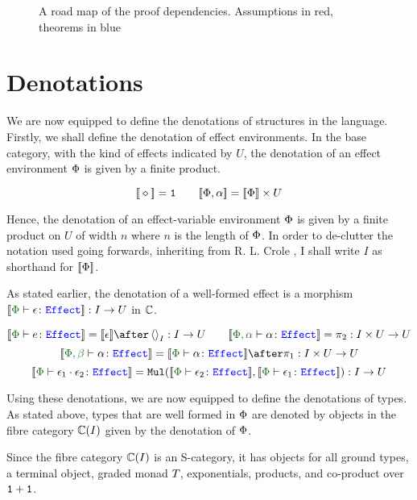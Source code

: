 \documentclass{Report}
\begin{document}
\begin{figure}[h!]
\begin{center}
{
    }
    \end{center}
\caption{A road map of the proof dependencies. Assumptions in red, theorems in blue}
\label{RoadMap}
\end{figure}


\section{Denotations}\label{PECDenotations}
We are now equipped to define the denotations of structures in the language. Firstly, we shall define the denotation of effect environments. In the base category, with the kind of effects indicated by $U$, the denotation of an effect environment $\P$ is given by a finite product.

\[
\deno{\nil} = \1 \quad\quad \deno{\P, \a} = \deno{\P}\times U    
\]

Hence, the denotation of an  effect-variable environment $\P$ is given by a finite product on $U$ of width $n$ where $n$ is the length of $\P$. In order to de-clutter the notation used going forwards, inheriting from R. L. Crole \needsRef, I shall write $I$ as shorthand for $\deno{\P}$.  


As stated earlier, the denotation of a well-formed effect is a morphism $\deno{\typerelation{\P}{\e}{\effect}}: I \rightarrow U$ in $\C$.

\[
    \deno{\typerelation{\P}{e}{\effect}} = \deno{\e} \after \term{I}: I\rightarrow U
    \quad\quad
    \deno{\typerelation{\P,\a}{\a}{\effect}} = \pp: I\times U \rightarrow U
\]\[
    \deno{\typerelation{\P, \b}{\a}{\effect}} = \deno{\typerelation{\P}{\a}{\effect}}\after\p: I\times U\rightarrow U
\]\[
    \deno{\typerelation{\P}{\e_1\dot \e_2}{\effect}} = \Mul(\deno{\typerelation{\P}{\e_2}{\effect}},\deno{\typerelation{\P}{\e_1}{\effect}}): I \rightarrow U
\]

Using these denotations, we are now equipped to define the denotations of types. As stated above, types that are well formed in $\P$ are denoted by objects in the fibre category $\C(I)$ given by the denotation of $\P$.
 
Since the fibre category $\C(I)$ is an S-category, it has objects for all ground types, a terminal object, graded monad $\T{}{}$, exponentials, products, and co-product over $\1+\1$.
\end{document}
